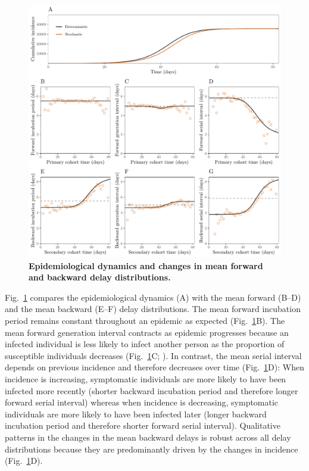 \documentclass[12pt]{article}
\newcommand{\fref}[1]{Fig.~\ref{fig:#1}}
\begin{document}
\begin{figure}[!ht]
\includegraphics[width=\textwidth]{forward.pdf}
\caption{
\textbf{Epidemiological dynamics and changes in mean forward and backward delay distributions.}
}
\label{fig:epi}
\end{figure}

\fref{epi} compares the epidemiological dynamics (A) with the mean forward (B--D) and the mean backward (E--F) delay distributions.
The mean forward incubation period remains constant throughout an epidemic as expected (\fref{epi}B).
The mean forward generation interval contracts as epidemic progresses because an infected individual is less likely to infect another person as the proportion of susceptible individuals decreases (\fref{epi}C; \cite{champredon2015intrinsic}).
In contrast, the mean serial interval depends on previous incidence and therefore decreases over time (\fref{epi}D):
When incidence is increasing, symptomatic individuals are more likely to have been infected more recently (shorter backward incubation period and therefore longer forward serial interval) whereas when incidence is decreasing, symptomatic individuals are more likely to have been infected later (longer backward incubation period and therefore shorter forward serial interval).
Qualitative patterns in the changes in the mean backward delays is robust across all delay distributions because they are predominantly driven by the changes in incidence (\fref{epi}D).
\end{document}
